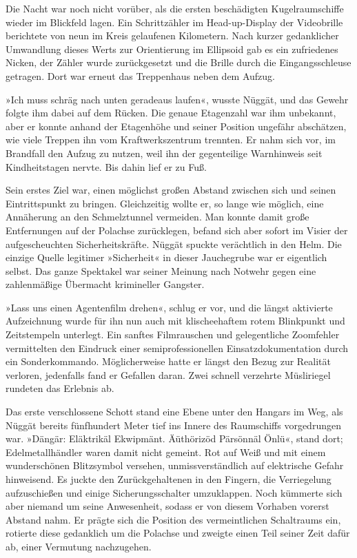 Die Nacht war noch nicht vorüber, als die ersten beschädigten Kugelraumschiffe wieder im Blickfeld lagen. Ein Schrittzähler im Head-up-Display der Videobrille berichtete von neun im Kreis gelaufenen Kilometern. Nach kurzer gedanklicher Umwandlung dieses Werts zur Orientierung im Ellipsoid gab es ein zufriedenes Nicken, der Zähler wurde zurückgesetzt und die Brille durch die Eingangsschleuse getragen. Dort war erneut das Treppenhaus neben dem Aufzug.

»Ich muss schräg nach unten geradeaus laufen«, wusste Nüggät, und das Gewehr folgte ihm dabei auf dem Rücken. Die genaue Etagenzahl war ihm unbekannt, aber er konnte anhand der Etagenhöhe und seiner Position ungefähr abschätzen, wie viele Treppen ihn vom Kraftwerkszentrum trennten. Er nahm sich vor, im Brandfall den Aufzug zu nutzen, weil ihn der gegenteilige Warnhinweis seit Kindheitstagen nervte. Bis dahin lief er zu Fuß.

Sein erstes Ziel war, einen möglichst großen Abstand zwischen sich und seinen Eintrittspunkt zu bringen. Gleichzeitig wollte er, so lange wie möglich, eine Annäherung an den Schmelztunnel vermeiden. Man konnte damit große Entfernungen auf der Polachse zurücklegen, befand sich aber sofort im Visier der aufgescheuchten Sicherheitskräfte. Nüggät spuckte verächtlich in den Helm. Die einzige Quelle legitimer »Sicherheit« in dieser Jauchegrube war er eigentlich selbst. Das ganze Spektakel war seiner Meinung nach Notwehr gegen eine zahlenmäßige Übermacht krimineller Gangster.

»Lass uns einen Agentenfilm drehen«, schlug er vor, und die längst aktivierte Aufzeichnung wurde für ihn nun auch mit klischeehaftem rotem Blinkpunkt und Zeitstempeln unterlegt. Ein sanftes Filmrauschen und gelegentliche Zoomfehler vermittelten den Eindruck einer semiprofessionellen Einsatzdokumentation durch ein Sonderkommando. Möglicherweise hatte er längst den Bezug zur Realität verloren, jedenfalls fand er Gefallen daran. Zwei schnell verzehrte Müsliriegel rundeten das Erlebnis ab.

Das erste verschlossene Schott stand eine Ebene unter den Hangars im Weg, als Nüggät bereits fünfhundert Meter tief ins Innere des Raumschiffs vorgedrungen war. »Dängär: Eläktrikäl Ekwipmänt. Äüthörizöd Pärsönnäl Önlü«, stand dort; Edelmetallhändler waren damit nicht gemeint. Rot auf Weiß und mit einem wunderschönen Blitzsymbol versehen, unmissverständlich auf elektrische Gefahr hinweisend. Es juckte den Zurückgehaltenen in den Fingern, die Verriegelung aufzuschießen und einige Sicherungsschalter umzuklappen. Noch kümmerte sich aber niemand um seine Anwesenheit, sodass er von diesem Vorhaben vorerst Abstand nahm. Er prägte sich die Position des vermeintlichen Schaltraums ein, rotierte diese gedanklich um die Polachse und zweigte einen Teil seiner Zeit dafür ab, einer Vermutung nachzugehen.

